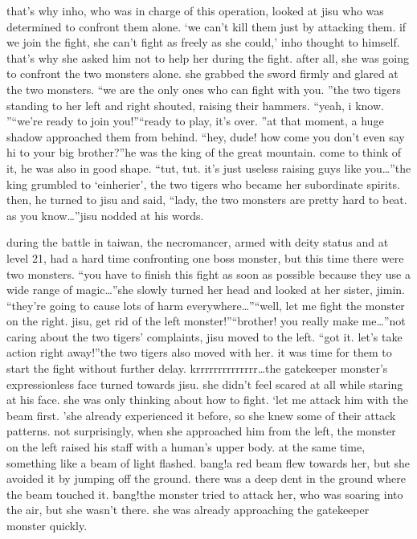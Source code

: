  that’s why inho, who was in charge of this operation, looked at jisu who was determined to confront them alone.
‘we can’t kill them just by attacking them.
 if we join the fight, she can’t fight as freely as she could,’ inho thought to himself.
that’s why she asked him not to help her during the fight.
 after all, she was going to confront the two monsters alone.
she grabbed the sword firmly and glared at the two monsters.
“we are the only ones who can fight with you.
”the two tigers standing to her left and right shouted, raising their hammers.
“yeah, i know.
”“we’re ready to join you!”“ready to play, it’s over.
”at that moment, a huge shadow approached them from behind.
“hey, dude! how come you don’t even say hi to your big brother?”he was the king of the great mountain.
 come to think of it, he was also in good shape.
“tut, tut.
 it’s just useless raising guys like you…”the king grumbled to ‘einherier’, the two tigers who became her subordinate spirits.
then, he turned to jisu and said, “lady, the two monsters are pretty hard to beat.
 as you know…”jisu nodded at his words.


during the battle in taiwan, the necromancer, armed with deity status and at level 21, had a hard time confronting one boss monster, but this time there were two monsters.
“you have to finish this fight as soon as possible because they use a wide range of magic…”she slowly turned her head and looked at her sister, jimin.
“they’re going to cause lots of harm everywhere…”“well, let me fight the monster on the right.
 jisu, get rid of the left monster!”“brother! you really make me…”not caring about the two tigers’ complaints, jisu moved to the left.
“got it.
 let’s take action right away!”the two tigers also moved with her.
 it was time for them to start the fight without further delay.
krrrrrrrrrrrrrr…the gatekeeper monster’s expressionless face turned towards jisu.
she didn’t feel scared at all while staring at his face.
 she was only thinking about how to fight.
‘let me attack him with the beam first.
’she already experienced it before, so she knew some of their attack patterns.
not surprisingly, when she approached him from the left, the monster on the left raised his staff with a human’s upper body.
 at the same time, something like a beam of light flashed.
bang!a red beam flew towards her, but she avoided it by jumping off the ground.
 there was a deep dent in the ground where the beam touched it.
bang!the monster tried to attack her, who was soaring into the air, but she wasn’t there.
 she was already approaching the gatekeeper monster quickly.


 